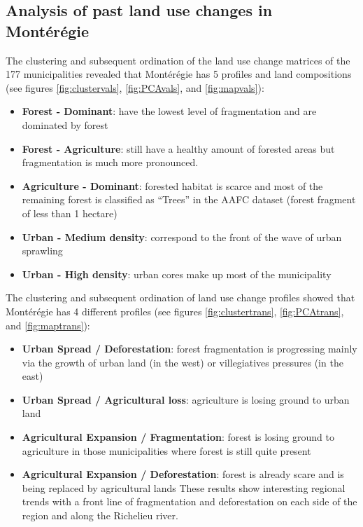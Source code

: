 \subsection{Analysis of past land use changes in Montérégie}

The clustering and subsequent ordination of the land use change matrices of the 177 municipalities revealed that Montérégie has 5 profiles and land compositions (see figures \ref{fig:clustervals}, \ref{fig:PCAvals}, and \ref{fig:mapvals}):
\renewcommand{\labelitemi}{$\textendash$}
\begin{itemize}[leftmargin=0.5cm]
  \item \textbf{Forest - Dominant}: have the lowest level of fragmentation and are dominated by forest
  \item \textbf{Forest - Agriculture}: still have a healthy amount of forested areas but fragmentation is much more pronounced.
  \item \textbf{Agriculture - Dominant}: forested habitat is scarce and most of the remaining forest is classified as “Trees” in the AAFC dataset (forest fragment of less than 1 hectare)
  \item \textbf{Urban - Medium density}: correspond to the front of the wave of urban sprawling
  \item \textbf{Urban - High density}: urban cores make up most of the municipality
\end{itemize} 

The clustering and subsequent ordination of land use change profiles showed that Montérégie has 4 different profiles (see figures \ref{fig:clustertrans}, \ref{fig:PCAtrans}, and \ref{fig:maptrans}):
\begin{itemize}[leftmargin=0.5cm]
  \item \textbf{Urban Spread / Deforestation}: forest fragmentation is progressing mainly via the growth of urban land (in the west) or villegiatives pressures (in the east)
  \item \textbf{Urban Spread / Agricultural loss}: agriculture is losing ground to urban land
  \item \textbf{Agricultural Expansion / Fragmentation}: forest is losing ground to agriculture in those municipalities where forest is still quite present
  \item \textbf{Agricultural Expansion / Deforestation}: forest is already scare and is being replaced by agricultural lands
These results show interesting regional trends with a front line of fragmentation and deforestation on each side of the region and along the Richelieu river. \\ %
\end{itemize}

